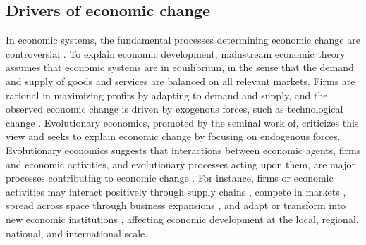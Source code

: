 \subsection{Drivers of economic change}
In economic systems, the fundamental processes determining economic change are controversial \citep{Dopfer,Nelson2014,Hodgson2019}. 
To explain economic development, mainstream economic theory \citep{10.1093/cje/bet027} assumes that economic systems are in equilibrium, in the sense that the demand and supply of goods and services are balanced on all relevant markets. 
Firms are rational in maximizing profits by adapting to demand and supply, and the observed economic change is driven by exogenous forces, such as technological change \citep{Romer1986}. Evolutionary economics, promoted by the seminal work of\cite{Nelson2014}, criticizes this view and seeks to explain economic change by focusing on endogenous forces. 
% 
Evolutionary economics suggests that interactions between economic agents, firms and economic activities, and evolutionary processes acting upon them, are major processes contributing to economic change \citep{Hodgson2019}.
% 
For instance, firms or economic activities may interact positively through supply chains \cite{Ozman2009,Saavedra2009a,VanDerPanne2004}, compete in markets \citep{Wernerfelt1989,}, spread across space through business expansions \citep{RogersEverettM2003DoI,Zahra2000}, and adapt \citep{Cordes2006} or transform into new economic institutions  \citep{Freeman2002,Hodgson2004,Aldrich2008}, affecting economic development at the local, regional, national, and international scale.
%
% 
